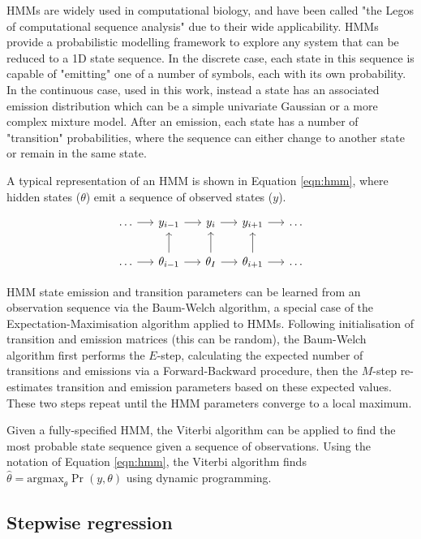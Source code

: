 \documentclass[a4paper,11pt,oneside]{book}
\begin{document}
HMMs are widely used in computational biology, and have been called "the Legos of computational sequence analysis"\cite{Eddy2004} due to their wide applicability. HMMs provide a probabilistic modelling framework to explore any system that can be reduced to a 1D state sequence.\cite{Eddy1996, Rabiner1989} In the discrete case, each state in this sequence is capable of "emitting" one of a number of symbols, each with its own probability. In the continuous case, used in this work, instead a state has an associated emission distribution which can be a simple univariate Gaussian or a more complex mixture model. After an emission, each state has a number of "transition" probabilities, where the sequence can either change to another state or remain in the same state.

A typical representation of an HMM is shown in Equation \ref{eqn:hmm}, where hidden states ($\theta$) emit a sequence of observed states ($y$).\cite{Volg2005}

\begin{equation}\label{eqn:hmm}
\begin{tikzcd}[column sep=1.2pc]
\ldots \arrow{r} & y_{i-1} \arrow{r} & y_i \arrow{r} & y_{i+1} \arrow{r} & \ldots\\
\ldots \arrow{r} & \theta_{i-1} \arrow{r} \arrow{u} &
\theta_I \arrow{u} \arrow{r} & \theta_{i+1} \arrow{u} \arrow{r} & \ldots
\end{tikzcd}
\end{equation}

HMM state emission and transition parameters can be learned from an observation sequence via the Baum-Welch algorithm,\cite{Baum1970} a special case of the Expectation-Maximisation algorithm applied to HMMs. Following initialisation of transition and emission matrices (this can be random), the Baum-Welch algorithm first performs the $E$-step, calculating the expected number of transitions and emissions via a Forward-Backward procedure, then the $M$-step re-estimates transition and emission parameters based on these expected values. These two steps repeat until the HMM parameters converge to a local maximum.

Given a fully-specified HMM, the Viterbi algorithm can be applied to find the most probable state sequence given a sequence of observations.\cite{ryan1993viterbi} Using the notation of Equation \ref{eqn:hmm}, the Viterbi algorithm finds $\hat{\theta} = \mathrm{argmax}_\theta \Pr( y, \theta)$ using dynamic programming.\cite{Volg2005}

\subsection{Stepwise regression}\label{meth:stepregress}
\end{document}
